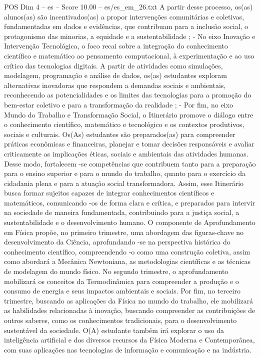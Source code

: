 \begin{textsample}{POS Dim 4 – es – Score 10.00 – es/es\_em\_26.txt}
A partir desse processo, os(as) alunos(as) são incentivados(as) a propor intervenções comunitárias e coletivas, fundamentadas em dados e evidências, que contribuam para a inclusão social, o protagonismo das minorias, a equidade e a sustentabilidade ; - No eixo Inovação e Intervenção Tecnológica, o foco recai sobre a integração do conhecimento científico e matemático ao pensamento computacional, à experimentação e ao uso crítico das tecnologias digitais.
A partir de atividades como simulações, modelagem, programação e análise de dados, os(as) estudantes exploram alternativas inovadoras que respondem a demandas sociais e ambientais, reconhecendo as potencialidades e os limites das tecnologias para a promoção do bem-estar coletivo e para a transformação da realidade ; - Por fim, no eixo Mundo do Trabalho e Transformação Social, o Itinerário promove o diálogo entre o conhecimento científico, matemático e tecnológico e os contextos produtivos, sociais e culturais.
Os(As) estudantes são preparados(as) para compreender práticas econômicas e financeiras, planejar e tomar decisões responsáveis e avaliar criticamente as implicações éticas, sociais e ambientais das atividades humanas.
Desse modo, fortalecem -se competências que contribuem tanto para a preparação para o ensino superior e para o mundo do trabalho, quanto para o exercício da cidadania plena e para a atuação social transformadora.
Assim, esse Itinerário busca formar sujeitos capazes de integrar conhecimentos científicos e matemáticos, comunicando -os de forma clara e crítica, e preparados para intervir na sociedade de maneira fundamentada, contribuindo para a justiça social, a sustentabilidade e o desenvolvimento humano.
O componente de Aprofundamento em Física propõe, no primeiro trimestre, uma abordagem das figuras-chave no desenvolvimento da Ciência, aprofundando -se na perspectiva histórica do conhecimento científico, compreendendo -o como uma construção coletiva, assim como abordará a Mecânica Newtoniana, as metodologias científicas e as técnicas de modelagem do mundo físico.
No segundo trimestre, o aprofundamento mobilizará os conceitos da Termodinâmica para compreender a produção e o consumo de energia e seus impactos ambientais e sociais.
Por fim, no terceiro trimestre, buscando as aplicações da Física no mundo do trabalho, ele mobilizará as habilidades relacionadas à inovação, buscando compreender as contribuições de outros saberes, como os conhecimentos tradicionais, para o desenvolvimento sustentável da sociedade.
O(A) estudante também irá explorar o uso da inteligência artificial e dos diversos recursos da Física Moderna e Contemporânea, com suas aplicações nas tecnologias de informação e comunicação e na indústria.

\end{textsample}
